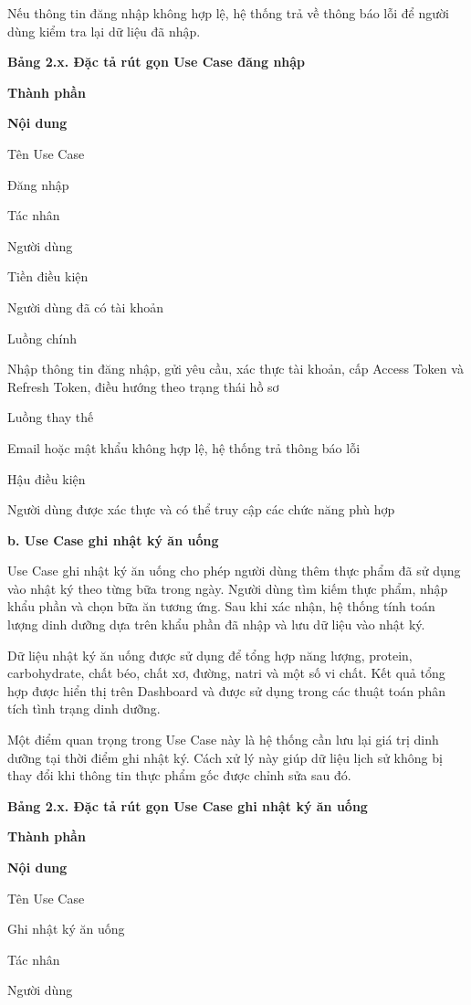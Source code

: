 \documentclass[12pt, a4paper]{report}
\begin{document}
Nếu thông tin đăng nhập không hợp lệ, hệ thống trả về thông báo lỗi để người dùng kiểm tra lại dữ liệu đã nhập.

\textbf{Bảng 2.x. Đặc tả rút gọn Use Case đăng nhập}

\textbf{Thành phần}

\textbf{Nội dung}

Tên Use Case

Đăng nhập

Tác nhân

Người dùng

Tiền điều kiện

Người dùng đã có tài khoản

Luồng chính

Nhập thông tin đăng nhập, gửi yêu cầu, xác thực tài khoản, cấp Access Token và Refresh Token, điều hướng theo trạng thái hồ sơ

Luồng thay thế

Email hoặc mật khẩu không hợp lệ, hệ thống trả thông báo lỗi

Hậu điều kiện

Người dùng được xác thực và có thể truy cập các chức năng phù hợp

\textbf{b. Use Case ghi nhật ký ăn uống}

Use Case ghi nhật ký ăn uống cho phép người dùng thêm thực phẩm đã sử dụng vào nhật ký theo từng bữa trong ngày. Người dùng tìm kiếm thực phẩm, nhập khẩu phần và chọn bữa ăn tương ứng. Sau khi xác nhận, hệ thống tính toán lượng dinh dưỡng dựa trên khẩu phần đã nhập và lưu dữ liệu vào nhật ký.

Dữ liệu nhật ký ăn uống được sử dụng để tổng hợp năng lượng, protein, carbohydrate, chất béo, chất xơ, đường, natri và một số vi chất. Kết quả tổng hợp được hiển thị trên Dashboard và được sử dụng trong các thuật toán phân tích tình trạng dinh dưỡng.

Một điểm quan trọng trong Use Case này là hệ thống cần lưu lại giá trị dinh dưỡng tại thời điểm ghi nhật ký. Cách xử lý này giúp dữ liệu lịch sử không bị thay đổi khi thông tin thực phẩm gốc được chỉnh sửa sau đó.

\textbf{Bảng 2.x. Đặc tả rút gọn Use Case ghi nhật ký ăn uống}

\textbf{Thành phần}

\textbf{Nội dung}

Tên Use Case

Ghi nhật ký ăn uống

Tác nhân

Người dùng
\end{document}
